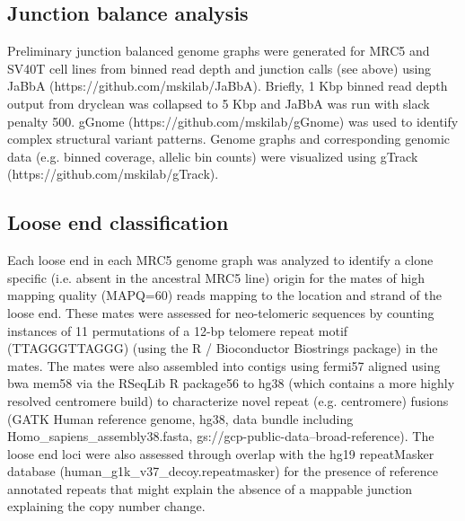 \documentclass[phd,tocprelim]{cornell}
\begin{document}
\subsection*{Junction balance analysis}
Preliminary junction balanced genome graphs were generated for MRC5 and SV40T cell lines from binned read depth and junction calls (see above) using JaBbA (https://github.com/mskilab/JaBbA)\cite{Hadi2020-um}. Briefly, 1 Kbp binned read depth output from dryclean was collapsed to 5 Kbp and JaBbA was run with slack penalty 500. gGnome (https://github.com/mskilab/gGnome) was used to identify complex structural variant patterns. Genome graphs and corresponding genomic data (e.g. binned coverage, allelic bin counts) were visualized using gTrack (https://github.com/mskilab/gTrack). 

\subsection*{Loose end classification} \label{app:tc_loose_end}
Each loose end in each MRC5 genome graph was analyzed to identify a clone specific (i.e. absent in the ancestral MRC5 line) origin for the mates of high mapping quality (MAPQ=60) reads mapping to the location and strand of the loose end. These mates were assessed for neo-telomeric sequences by counting instances of 11 permutations of a 12-bp telomere repeat motif (TTAGGGTTAGGG) (using the R / Bioconductor Biostrings package) in the mates. The mates were also assembled into contigs using fermi57 aligned using bwa mem58 via the RSeqLib R package56 to hg38 (which contains a more  highly resolved centromere build) to characterize novel repeat (e.g. centromere) fusions (GATK Human reference genome, hg38, data bundle including Homo\_sapiens\_assembly38.fasta, gs://gcp-public-data--broad-reference). The loose end loci were also assessed through overlap with the hg19 repeatMasker database (human\_g1k\_v37\_decoy.repeatmasker) for the presence of reference annotated repeats that might explain the absence of a mappable junction explaining the copy number change.  
\end{document}
